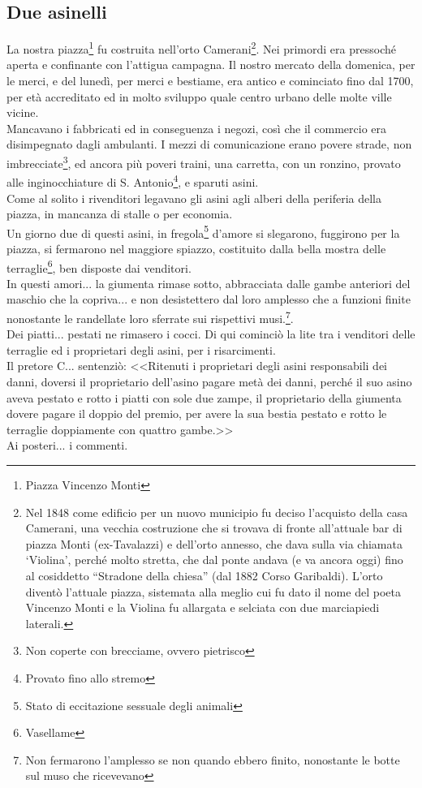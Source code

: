 \subsection{Due asinelli}
La nostra piazza\footnote{Piazza Vincenzo Monti} fu costruita nell'orto Camerani\footnote{Nel 1848 come edificio per un nuovo municipio fu deciso l'acquisto della casa Camerani, una vecchia costruzione che si trovava di fronte all'attuale bar di piazza Monti (ex-Tavalazzi) e dell'orto annesso, che dava sulla via chiamata `Violina', perché molto stretta, che dal ponte andava (e va ancora oggi) fino al cosiddetto “Stradone della chiesa” (dal 1882 Corso Garibaldi). L'orto diventò l'attuale piazza, sistemata alla meglio cui fu dato il nome del poeta Vincenzo Monti e la Violina fu allargata e selciata con due marciapiedi laterali.}. Nei primordi era pressoché aperta e confinante con l'attigua campagna. Il nostro mercato della domenica, per le merci, e del lunedì, per merci e bestiame, era antico e cominciato fino dal 1700, per età accreditato ed in molto sviluppo quale centro urbano delle molte ville vicine. \\
\indent Mancavano i fabbricati ed in conseguenza i negozi, così che il commercio era disimpegnato dagli ambulanti. I mezzi di comunicazione erano povere strade, non imbrecciate\footnote{Non coperte con brecciame, ovvero pietrisco}, ed ancora più poveri traini, una carretta, con un ronzino, provato alle inginocchiature di S. Antonio\footnote{Provato fino allo stremo}, e sparuti asini. \\
\indent Come al solito i rivenditori legavano gli asini agli alberi della periferia della piazza, in mancanza di stalle o per economia.\\
\indent Un giorno due di questi asini, in fregola\footnote{Stato di eccitazione sessuale degli animali} d'amore si slegarono, fuggirono per la piazza, si fermarono nel maggiore spiazzo, costituito dalla bella mostra delle terraglie\footnote{Vasellame},  ben disposte dai venditori.\\
\indent In questi amori... la giumenta rimase sotto, abbracciata dalle gambe anteriori del maschio che la copriva... e non desistettero dal loro amplesso che a funzioni finite nonostante le randellate loro sferrate sui rispettivi musi.\footnote{Non fermarono l'amplesso se non quando ebbero finito, nonostante le botte sul muso che ricevevano}.\\
\indent Dei piatti... pestati ne rimasero i cocci. Di qui cominciò la lite tra i venditori delle terraglie ed i proprietari degli asini, per i risarcimenti. \\
\indent Il pretore C\:.\:.\:. sentenziò: <<Ritenuti i proprietari degli asini responsabili dei danni, doversi il proprietario dell'asino pagare metà dei danni, perché il suo asino aveva pestato e rotto i piatti con sole due zampe, il proprietario della giumenta dovere pagare il doppio del premio, per avere la sua bestia pestato e rotto le terraglie doppiamente con quattro gambe.>>\\
\indent Ai posteri... i commenti.

